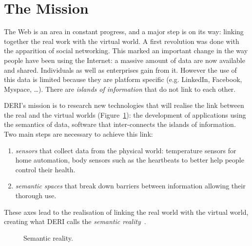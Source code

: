 \section{The Mission}

The Web is an area in constant progress, and a major step is on its way:
linking together the real work with the virtual world. A first revolution was
done with the apparition of social networking. This marked an important change
in the way people have been using the Internet: a massive amount of data are
now available and shared. Individuals as well as enterprises gain from it.
However the use of this data is limited because they are platform specific
(e.g. LinkedIn, Facebook, Myspace, \ldots). There are \emph{islands of
information} that do not link to each other.

DERI's mission is to research new technologies that will realise the link
between the real and the virtual worlds (Figure~\ref{fig:deri-mission}): the
development of applications using the semantics of data, software that
inter-connects the islands of information. Two main steps are necessary to
achieve this link:
\begin{enumerate}
  \item \emph{sensors} that collect data from the physical world:
  temperature sensors for home automation, body sensors such as the heartbeats
  to better help people control their health.
  \item \emph{semantic spaces} that break down barriers between information
  allowing their thorough use.
\end{enumerate}
These axes lead to the realisation of linking the real world with the virtual
world, creating what DERI calls the \emph{semantic
reality}~\cite{decker:2008:semantic-reality}.

\begin{figure}
\centering
{}
\caption{Semantic reality.}
\label{fig:deri-mission}
\end{figure}

